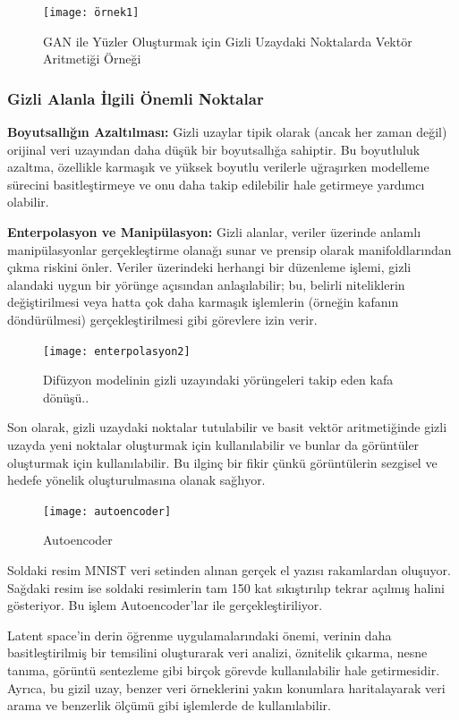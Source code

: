 \documentclass[12pt, a4paper]{article}
\begin{document}
	\begin{figure}[h]
		\centering
		\texttt{[image: örnek1]}
		\label{örnek1}
		\caption{GAN ile Yüzler Oluşturmak için Gizli Uzaydaki Noktalarda Vektör Aritmetiği Örneği\cite{radford2015unsupervised}}
	\end{figure}
	\FloatBarrier
	\subsubsection{Gizli Alanla İlgili Önemli Noktalar}
	\textbf{Boyutsallığın Azaltılması:} Gizli uzaylar tipik olarak (ancak her zaman değil) orijinal veri uzayından daha düşük bir boyutsallığa sahiptir. Bu boyutluluk azaltma, özellikle karmaşık ve yüksek boyutlu verilerle uğraşırken modelleme sürecini basitleştirmeye ve onu daha takip edilebilir hale getirmeye yardımcı olabilir. 
	
	\textbf{Enterpolasyon ve Manipülasyon:} Gizli alanlar, veriler üzerinde anlamlı manipülasyonlar gerçekleştirme olanağı sunar ve prensip olarak manifoldlarından çıkma riskini önler. Veriler üzerindeki herhangi bir düzenleme işlemi, gizli alandaki uygun bir yörünge açısından anlaşılabilir; bu, belirli niteliklerin değiştirilmesi veya hatta çok daha karmaşık işlemlerin (örneğin kafanın döndürülmesi) gerçekleştirilmesi gibi görevlere izin verir.
	
	\begin{figure}[h]
		\centering
		\texttt{[image: enterpolasyon2]}
		\caption{Difüzyon modelinin gizli uzayındaki yörüngeleri takip eden kafa dönüşü.\cite{asperti2023head}.}
		\label{enterpolasyon2}
	\end{figure}
	\FloatBarrier
	Son olarak, gizli uzaydaki noktalar tutulabilir ve basit vektör aritmetiğinde gizli uzayda yeni noktalar oluşturmak için kullanılabilir ve bunlar da görüntüler oluşturmak için kullanılabilir. Bu ilginç bir fikir çünkü görüntülerin sezgisel ve hedefe yönelik oluşturulmasına olanak sağlıyor.
	
	\begin{figure}[h]
		\centering
		\texttt{[image: autoencoder]}
		\label{autoencoder}
		\caption{Autoencoder\cite{AutoEncoder-2024-04-04}}
	\end{figure}
	\FloatBarrier
	Soldaki resim MNIST veri setinden alınan gerçek el yazısı rakamlardan oluşuyor. Sağdaki resim ise soldaki resimlerin tam 150 kat sıkıştırılıp tekrar açılmış halini gösteriyor. Bu işlem Autoencoder’lar ile gerçekleştiriliyor.
	
	Latent space'in derin öğrenme uygulamalarındaki önemi, verinin daha basitleştirilmiş bir temsilini oluşturarak veri analizi, öznitelik çıkarma, nesne tanıma, görüntü sentezleme gibi birçok görevde kullanılabilir hale getirmesidir. Ayrıca, bu gizil uzay, benzer veri örneklerini yakın konumlara haritalayarak veri arama ve benzerlik ölçümü gibi işlemlerde de kullanılabilir.
	
\end{document}

